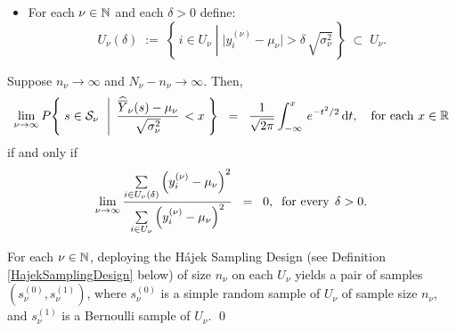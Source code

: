 \begin{theorem}
\begin{itemize}
\begin{equation*}
\end{equation*}
\item For each $\nu \in \mathbb{N}$ and each $\delta > 0$ define:
\begin{equation*}
U_{\nu}(\delta) \;:=\; \left\{\,i \in U_{\nu}\;\left\vert\; \vert y^{(\nu)}_{i} - \mu_{\nu} \vert > \delta \, \sqrt{\sigma_{\nu}^{2}} \right.\,\right\}
\; \subset \; U_{\nu}.
\end{equation*}
\end{itemize}
Suppose $n_{\nu} \longrightarrow \infty$ and $N_{\nu} - n_{\nu} \longrightarrow \infty$.
Then,
\begin{equation*}
\lim_{\nu \rightarrow \infty}
P\!\left\{\;s \in \mathcal{S}_{\nu} \;\,\left\vert\;\,\dfrac{\widehat{\overline{Y}}_{\nu}(s) - \mu_{\nu}}{\sqrt{\sigma_{\nu}^{2}}}\right. < x \;\right\}
\;\;=\;\;
\dfrac{1}{\sqrt{2\pi}}
\int_{-\infty}^{x}\,e^{-t^{2}/2}\,\textnormal{d} t,
\quad
\textnormal{for each $x \in \mathbb{R}$}
\end{equation*}
if and only if
\begin{equation*}
\lim_{\nu\rightarrow\infty}
\dfrac{
\underset{i \in U_{\nu}(\delta)}{\sum}\left(y^{(\nu)}_{i} - \mu_{\nu}\right)^{2}
}{
\underset{i \in U_{\nu}}{\sum}\left(y^{(\nu)}_{i} - \mu_{\nu}\right)^{2}
}\;\; = \;\; 0,
\;\;\textnormal{for every}\;\, \delta > 0.
\end{equation*}
\end{theorem}

\proofoutline
For each $\nu\in\mathbb{N}$, deploying the H\'ajek Sampling Design (see Definition \ref{HajekSamplingDesign} below)
of size $n_{\nu}$ on each $U_{\nu}$ yields a pair of samples $\left(s^{(0)}_{\nu},s^{(1)}_{\nu}\right)$, where $s^{(0)}_{\nu}$
is a simple random sample of $U_{\nu}$ of sample size $n_{\nu}$, and $s^{(1)}_{\nu}$ is a Bernoulli sample of $U_{\nu}$. 
\qed

